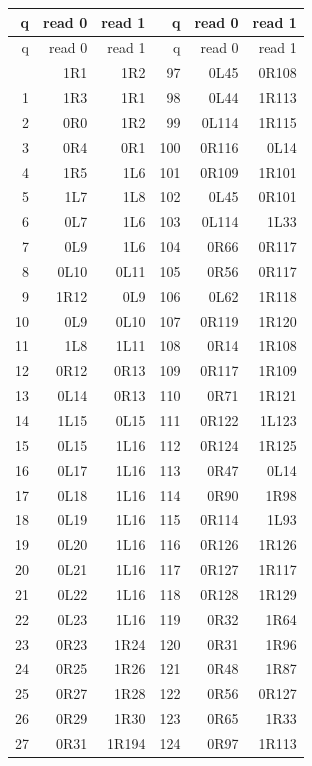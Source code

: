{\small\ttfamily
\setlength{\tabcolsep}{14pt}
\begin{longtable}{rrr@{\hspace{2.5em}}rrr}
\toprule q & read 0 & read 1 & q & read 0 & read 1\\\midrule\endfirsthead
\toprule q & read 0 & read 1 & q & read 0 & read 1\\\midrule\endhead
\bottomrule\endfoot
0 & 1R1 & 1R2 & 97 & 0L45 & 0R108\\
1 & 1R3 & 1R1 & 98 & 0L44 & 1R113\\
2 & 0R0 & 1R2 & 99 & 0L114 & 1R115\\
3 & 0R4 & 0R1 & 100 & 0R116 & 0L14\\
4 & 1R5 & 1L6 & 101 & 0R109 & 1R101\\
5 & 1L7 & 1L8 & 102 & 0L45 & 0R101\\
6 & 0L7 & 1L6 & 103 & 0L114 & 1L33\\
7 & 0L9 & 1L6 & 104 & 0R66 & 0R117\\
8 & 0L10 & 0L11 & 105 & 0R56 & 0R117\\
9 & 1R12 & 0L9 & 106 & 0L62 & 1R118\\
10 & 0L9 & 0L10 & 107 & 0R119 & 1R120\\
11 & 1L8 & 1L11 & 108 & 0R14 & 1R108\\
12 & 0R12 & 0R13 & 109 & 0R117 & 1R109\\
13 & 0L14 & 0R13 & 110 & 0R71 & 1R121\\
14 & 1L15 & 0L15 & 111 & 0R122 & 1L123\\
15 & 0L15 & 1L16 & 112 & 0R124 & 1R125\\
16 & 0L17 & 1L16 & 113 & 0R47 & 0L14\\
17 & 0L18 & 1L16 & 114 & 0R90 & 1R98\\
18 & 0L19 & 1L16 & 115 & 0R114 & 1L93\\
19 & 0L20 & 1L16 & 116 & 0R126 & 1R126\\
20 & 0L21 & 1L16 & 117 & 0R127 & 1R117\\
21 & 0L22 & 1L16 & 118 & 0R128 & 1R129\\
22 & 0L23 & 1L16 & 119 & 0R32 & 1R64\\
23 & 0R23 & 1R24 & 120 & 0R31 & 1R96\\
24 & 0R25 & 1R26 & 121 & 0R48 & 1R87\\
25 & 0R27 & 1R28 & 122 & 0R56 & 0R127\\
26 & 0R29 & 1R30 & 123 & 0R65 & 1R33\\
27 & 0R31 & 1R194 & 124 & 0R97 & 1R113\\

\end{longtable}}
